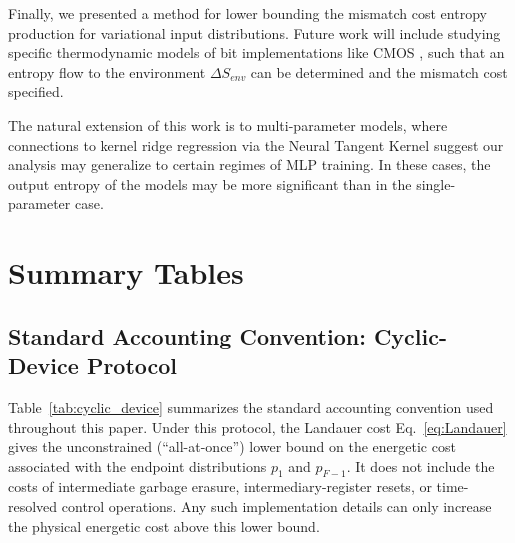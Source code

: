 \documentclass[12pt,onecolumn, margin=1in]{IEEEtran}
\begin{document}
Finally, we presented a method for lower bounding the mismatch cost entropy production for variational input distributions. 
Future work will include studying specific thermodynamic models of bit implementations like CMOS \cite{CMOS}, such that an entropy flow to the environment $\Delta S_{env}$ can be determined and the mismatch cost specified.

The natural extension of this work is to multi-parameter models, where connections to kernel ridge regression 
via the Neural Tangent Kernel \cite{jacot2020neuraltangentkernelconvergence,karkada2025predictingkernelregressionlearning, pmlr-v80-belkin18a} suggest our analysis may generalize to certain regimes of MLP training. In these cases, the output entropy of the models may be more significant than in the single-parameter case. 









\newpage
\appendices
\FloatBarrier

\section{Summary Tables}\label{app:summary_tables}

\subsection{Standard Accounting Convention: Cyclic-Device Protocol}\label{app:cyclic_device_table}

Table~\ref{tab:cyclic_device} summarizes the standard accounting convention used throughout this paper. Under this protocol, the Landauer cost Eq.~\eqref{eq:Landauer} gives the unconstrained (``all-at-once'') lower bound on the energetic cost associated with the endpoint distributions $p_1$ and $p_{F-1}$. It does not include the costs of intermediate garbage erasure, intermediary-register resets, or time-resolved control operations. Any such implementation details can only increase the physical energetic cost above this lower bound.
\end{document}
